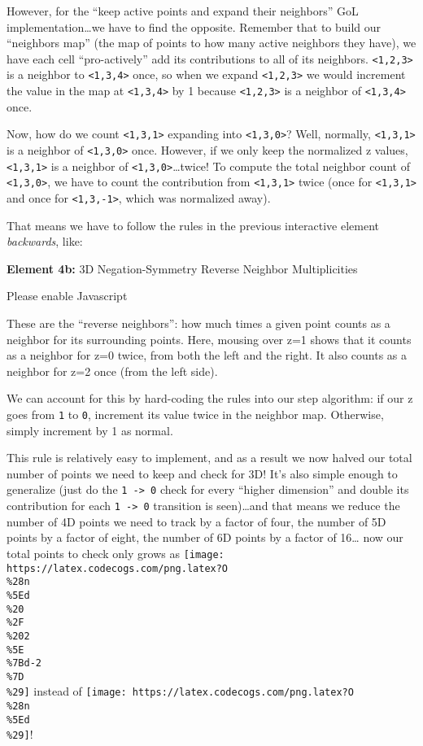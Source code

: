 \documentclass[]{article}
\begin{document}
However, for the ``keep active points and expand their neighbors'' GoL
implementation\ldots we have to find the opposite. Remember that to build our
``neighbors map'' (the map of points to how many active neighbors they have), we
have each cell ``pro-actively'' add its contributions to all of its neighbors.
\texttt{\textless{}1,2,3\textgreater{}} is a neighbor to
\texttt{\textless{}1,3,4\textgreater{}} once, so when we expand
\texttt{\textless{}1,2,3\textgreater{}} we would increment the value in the map
at \texttt{\textless{}1,3,4\textgreater{}} by 1 because
\texttt{\textless{}1,2,3\textgreater{}} is a neighbor of
\texttt{\textless{}1,3,4\textgreater{}} once.

Now, how do we count \texttt{\textless{}1,3,1\textgreater{}} expanding into
\texttt{\textless{}1,3,0\textgreater{}}? Well, normally,
\texttt{\textless{}1,3,1\textgreater{}} is a neighbor of
\texttt{\textless{}1,3,0\textgreater{}} once. However, if we only keep the
normalized z values, \texttt{\textless{}1,3,1\textgreater{}} is a neighbor of
\texttt{\textless{}1,3,0\textgreater{}}\ldots twice! To compute the total
neighbor count of \texttt{\textless{}1,3,0\textgreater{}}, we have to count the
contribution from \texttt{\textless{}1,3,1\textgreater{}} twice (once for
\texttt{\textless{}1,3,1\textgreater{}} and once for
\texttt{\textless{}1,3,-1\textgreater{}}, which was normalized away).

That means we have to follow the rules in the previous interactive element
\emph{backwards}, like:

\leavevmode\hypertarget{golSyms3DReverse}{}%
\textbf{Element 4b:} 3D Negation-Symmetry Reverse Neighbor Multiplicities

\leavevmode\hypertarget{golSyms3DReverseCont}{}%
Please enable Javascript

These are the ``reverse neighbors'': how much times a given point counts as a
neighbor for its surrounding points. Here, mousing over z=1 shows that it counts
as a neighbor for z=0 twice, from both the left and the right. It also counts as
a neighbor for z=2 once (from the left side).

We can account for this by hard-coding the rules into our step algorithm: if our
z goes from \texttt{1} to \texttt{0}, increment its value twice in the neighbor
map. Otherwise, simply increment by 1 as normal.

This rule is relatively easy to implement, and as a result we now halved our
total number of points we need to keep and check for 3D! It's also simple enough
to generalize (just do the \texttt{1\ -\textgreater{}\ 0} check for every
``higher dimension'' and double its contribution for each
\texttt{1\ -\textgreater{}\ 0} transition is seen)\ldots and that means we
reduce the number of 4D points we need to track by a factor of four, the number
of 5D points by a factor of eight, the number of 6D points by a factor of
16\ldots{} now our total points to check only grows as
\texttt{[image: https://latex.codecogs.com/png.latex?O\\\%28n\\\%5Ed\\\%20\\\%2F\\\%202\\\%5E\\\%7Bd-2\\\%7D\\\%29]}
instead of
\texttt{[image: https://latex.codecogs.com/png.latex?O\\\%28n\\\%5Ed\\\%29]}!
\end{document}
